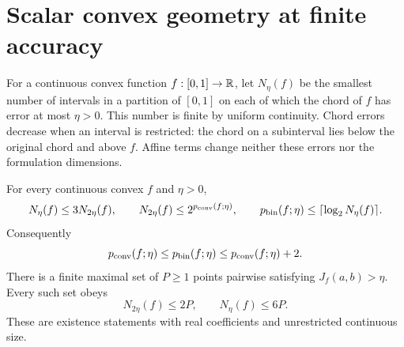 \section{Scalar convex geometry at finite accuracy}\label{sec:scalar-geometry}

For a continuous convex function $f:[0,1]\to\mathbb R$, let
$N_\eta(f)$ be the smallest number of intervals in a partition of
$[0,1]$ on each of which the chord of $f$ has error at most $\eta>0$.
This number is finite by uniform continuity. Chord errors decrease when
an interval is restricted: the chord on a subinterval lies below the
original chord and above $f$. Affine terms change neither these errors
nor the formulation dimensions.

\begin{lemma}\label{lem:scalar-chords}
For every continuous convex $f$ and $\eta>0$,
\begin{equation}\label{eq:scalar-chord-counts}
 N_\eta(f)\le3N_{2\eta}(f),\qquad
 N_{2\eta}(f)\le2^{p_{\mathrm{conv}}(f;\eta)},\qquad
 p_{\mathrm{bin}}(f;\eta)\le\lceil\log_2N_\eta(f)\rceil.
\end{equation}
Consequently
\begin{equation}\label{eq:scalar-two-bit}
 p_{\mathrm{conv}}(f;\eta)\le p_{\mathrm{bin}}(f;\eta)\le p_{\mathrm{conv}}(f;\eta)+2.
\end{equation}
There is a finite maximal set of $P\ge1$ points pairwise satisfying
$J_f(a,b)>\eta$. Every such set obeys
\begin{equation}\label{eq:scalar-packing-chords}
 N_{2\eta}(f)\le2P,\qquad N_\eta(f)\le6P.
\end{equation}
These are existence statements with real coefficients and unrestricted
continuous size.
\end{lemma}
